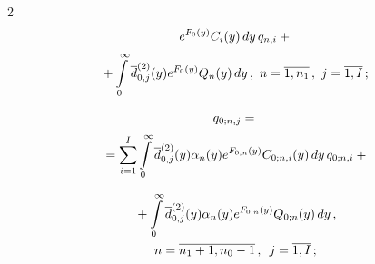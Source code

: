 \begin{multicols}{2}
\begin{multline}
e^{F_0(y)} C_i(y)\, dy\, q_{n,i}


+{}\\[2pt]


\hspace*{-2mm}{}+


\int\limits_0^\infty \d^{(2)}_{0,j}(y) e^{F_0(y)}  Q_{n}(y)\, dy\,,


\  n=\overline{1,n_1}\,,


\  j=\overline{1,I}\,;\!\!


\end{multline}







\vspace*{-12pt}





\noindent


\begin{multline*}


q_{0;n,j}= {}\\[2pt]


{}=\sum\limits_{i=1}^{I} \int\limits_0^\infty \d^{(2)}_{0,j}(y) \alpha_n(y)


e^{F_{0,n}(y)} C_{0;n,i}(y)\, dy\, q_{0;n,i}


+{}


\end{multline*}





\noindent


\begin{multline}


\label{cons-2-m}


{}+


\int\limits_0^\infty \d^{(2)}_{0,j}(y) \alpha_n(y) e^{F_{0,n}(y)} Q_{0;n}(y)\, dy\,,\\ 


n=\overline{n_1+1,n_0-1}\,, \enskip j=\overline{1,I}\,;


\end{multline}







\vspace*{-12pt}





\noindent



\end{multicols}
